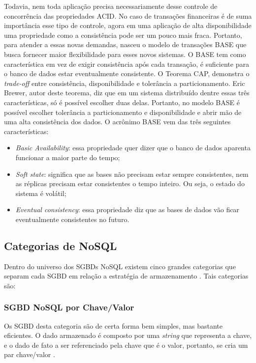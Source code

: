 	Todavia, nem toda aplicação precisa necessariamente desse controle de concorrência das propriedades ACID. No caso de transações financeiras é de suma importância esse tipo de controle, agora em uma aplicação de alta disponibilidade uma propriedade como a consistência pode ser um pouco mais fraca. Portanto, para atender a essas novas demandas, nasceu o modelo de transações BASE \cite{Pritchett:2008:BAA:1394127.1394128} que busca fornecer maior flexibilidade para esses novos sistemas. O BASE tem como característica em vez de exigir consistência após cada transação, é suficiente para o banco de dados estar eventualmente consistente. O Teorema CAP\cite{Brewer:2010:CFT:1835698.1835701}, demonstra o \textit{trade-off} entre consistência, disponibilidade e tolerância a particionamento. Eric Brewer, autor deste teorema, diz que em um sistema distribuído dentre essas três características, só é possível escolher duas delas. Portanto, no modelo BASE é possível escolher tolerância a particionamento e disponibilidade e abrir mão de uma alta consistência dos dados. O acrônimo BASE vem das três seguintes características:
	\begin{itemize}
		\item \textit{Basic Availability}: essa propriedade quer dizer que o banco de dados aparenta funcionar a maior parte do tempo;
		\item \textit{Soft state}: significa que as bases não precisam estar sempre consistentes, nem as réplicas precisam estar consistentes o tempo inteiro. Ou seja, o estado do sistema é volátil;
		\item \textit{Eventual consistency}: essa propriedade diz que as bases de dados vão ficar eventualmente consistentes no futuro. 
	\end{itemize}
	
\subsection{Categorias de NoSQL}
	Dentro do universo dos SGBDs NoSQL existem cinco grandes categorias que separam cada SGBD em relação a estratégia de armazenamento \cite{nayak2013type}. Tais categorias são:
	
\subsubsection{SGBD NoSQL por Chave/Valor}
	Os SGBD desta categoria são de certa forma bem simples, mas bastante eficientes. O dado armazenado é composto por uma \textit{string} que representa a chave, e o dado de fato a ser referenciado pela chave que é o valor, portanto, se cria um par chave/valor \cite{nayak2013type}\cite{kauremerging}.
	
